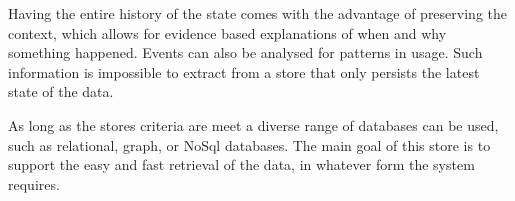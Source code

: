 Having the entire history of the state comes with the advantage of preserving the context, which allows for evidence based explanations of when and why something happened. Events can also be analysed for patterns in usage. Such information is impossible to extract from a store that only persists the latest state of the data.

As long as the stores criteria are meet a diverse range of databases can be used, such as relational, graph, or NoSql databases. The main goal of this store is to support the easy and fast retrieval of the data, in whatever form the system requires.






